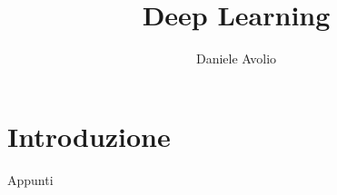 \documentclass{article}
\title{Deep Learning}
\author{Daniele Avolio}
\begin{document}
\maketitle
\newpage



\tableofcontents
\newpage
\section{Introduzione}
Appunti 




\end{document}
